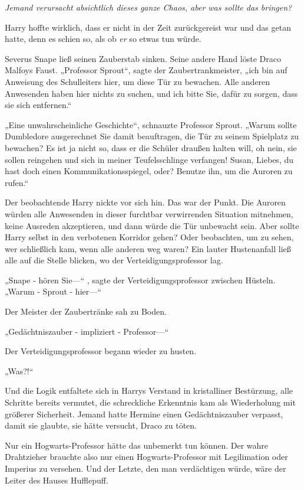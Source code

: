 {\emph{Jemand verursacht absichtlich dieses ganze Chaos, aber was sollte das bringen?}

Harry hoffte wirklich, dass er nicht in der Zeit zurückgereist war und das getan hatte, denn es schien so, als ob \emph{er} so etwas tun würde.

Severus Snape ließ seinen Zauberstab sinken. Seine andere Hand löste Draco Malfoys Faust. „Professor Sprout“, sagte der Zaubertrankmeister, „ich bin auf Anweisung des Schulleiters hier, um diese Tür zu bewachen. Alle anderen Anwesenden haben hier nichts zu suchen, und ich bitte Sie, dafür zu sorgen, dass sie sich entfernen.“

„Eine unwahrscheinliche Geschichte“, schnauzte Professor Sprout. „Warum sollte Dumbledore ausgerechnet Sie damit beauftragen, die Tür zu seinem Spielplatz zu bewachen? Es ist ja nicht so, dass er die Schüler draußen halten will, oh nein, sie sollen reingehen und sich in meiner Teufelsschlinge verfangen! Susan, Liebes, du hast doch einen Kommunikationsspiegel, oder? Benutze ihn, um die Auroren zu rufen.“

Der beobachtende Harry nickte vor sich hin. Das war der Punkt. Die Auroren würden alle Anwesenden in dieser furchtbar verwirrenden Situation mitnehmen, keine Ausreden akzeptieren, und dann würde die Tür unbewacht sein. Aber sollte Harry selbst in den verbotenen Korridor gehen? Oder beobachten, um zu sehen, wer schließlich kam, wenn alle anderen weg waren? Ein lauter Hustenanfall ließ alle auf die Stelle blicken, wo der Verteidigungsprofessor lag.

„Snape - hören Sie—“ , sagte der Verteidigungsprofessor zwischen Hüsteln. „Warum - Sprout - hier—“

Der Meister der Zaubertränke sah zu Boden.

„Gedächtniszauber - impliziert - Professor—“

Der Verteidigungsprofessor begann wieder zu husten.

„Was?!“

Und die Logik entfaltete sich in Harrys Verstand in kristalliner Bestürzung, alle Schritte bereits vermutet, die schreckliche Erkenntnis kam als Wiederholung mit größerer Sicherheit. Jemand hatte Hermine einen Gedächtniszauber verpasst, damit sie glaubte, sie hätte versucht, Draco zu töten.

Nur ein Hogwarts-Professor hätte das unbemerkt tun können. Der wahre Drahtzieher brauchte also nur einen Hogwarts-Professor mit Legilimation oder Imperius zu versehen. Und der Letzte, den man verdächtigen würde, wäre der Leiter des Hauses Hufflepuff.

}
